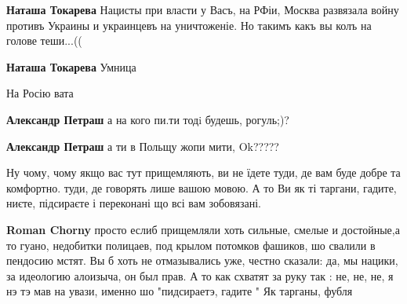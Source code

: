 \begin{itemize}
\begin{itemize}

\textbf{Наташа Токарева} Нацисты при власти у Васъ, на РФіи, Москва развязала войну противъ Украины и украинцевъ на уничтоженіе. Но такимъ какъ вы колъ на голове теши...((


\textbf{Наташа Токарева} Умница
\end{itemize}


На Росію вата

\begin{itemize}

\textbf{Александр Петраш} а на кого пи.ти тодi будешь, рогуль;)?


\textbf{Александр Петраш} а ти в Польщу жопи мити, Ok?????
\end{itemize}



Ну чому, чому якщо вас тут прищемляють, ви не їдете туди, де вам буде добре та
комфортно. туди, де говорять лише вашою мовою. А то Ви як ті таргани, гадите,
ниєте, підсираєте і переконані що всі вам зобовязані.

\begin{itemize}

\textbf{Roman Chorny} просто еслиб прищемляли хоть сильные, смелые и
достойные,а то гуано, недобитки полицаев, под крылом потомков фашиков, шо
свалили в пендосию мстят. Вы б хоть не отмазывались уже, честно сказали: да, мы
нацики, за идеологию алоизыча, он был прав. А то как схватят за руку так : не,
не, не, я нэ тэ мав на увази, именно шо "пидсираетэ, гадите " Як тарганы, фубля



\end{itemize}
\end{itemize}

